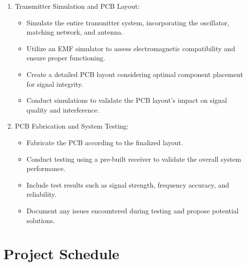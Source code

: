 \documentclass[]{extarticle}
\begin{document}
\begin{enumerate}
    \item {Transmitter Simulation and PCB Layout:}
    \begin{itemize}
        \item Simulate the entire transmitter system, incorporating the oscillator, matching network, and antenna.
        \item Utilize an EMF simulator to assess electromagnetic compatibility and ensure proper functioning.
        \item Create a detailed PCB layout considering optimal component placement for signal integrity.
        \item Conduct simulations to validate the PCB layout's impact on signal quality and interference.
    \end{itemize}

    \item {PCB Fabrication and System Testing:}
    \begin{itemize}
        \item Fabricate the PCB according to the finalized layout.
        \item Conduct testing using a pre-built receiver to validate the overall system performance.
        \item Include test results such as signal strength, frequency accuracy, and reliability.
        \item Document any issues encountered during testing and propose potential solutions.
    \end{itemize}
\end{enumerate}

\newpage
\section{Project Schedule}

\end{document}
